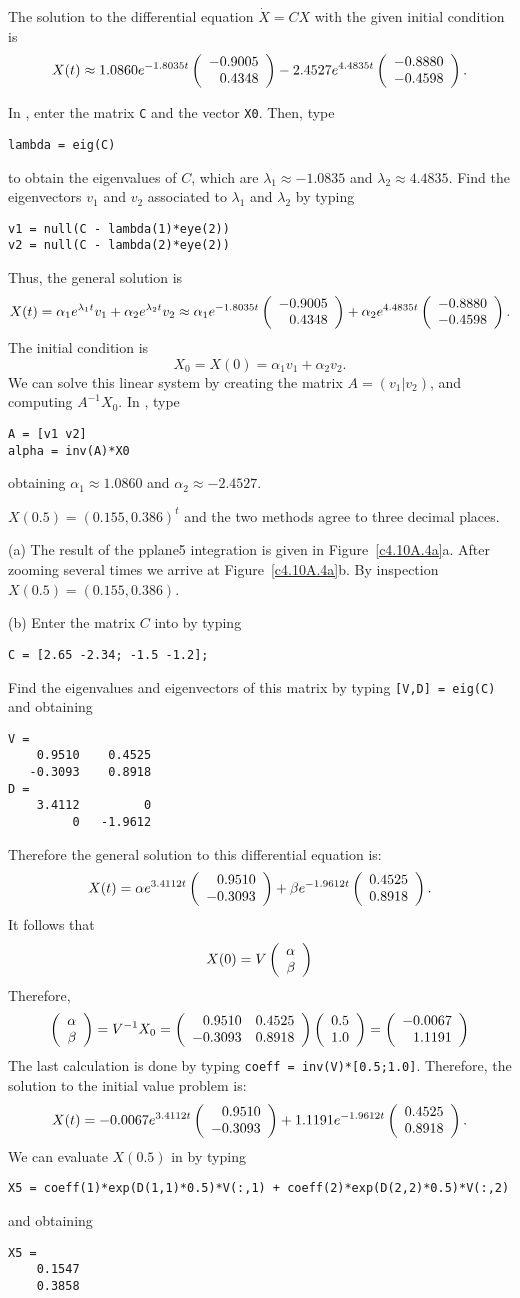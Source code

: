 \documentclass{ximera}
\begin{document}
 \ans The solution to the differential equation $\dot{X}
= CX$ with the given initial condition is
\[
X(t) \approx 1.0860e^{-1.8035t}\left(\begin{array}{r} -0.9005 \\  0.4348\end{array}\right)
- 2.4527e^{4.4835t}\left(\begin{array}{r} -0.8880 \\ -0.4598\end{array}\right).
\]

\soln In \Matlabp, enter the matrix {\tt C} and the vector {\tt X0}.  Then,
type
\begin{verbatim}
lambda = eig(C)
\end{verbatim}
to obtain the eigenvalues of $C$, which are
$\lambda_1 \approx -1.0835$ and $\lambda_2 \approx 4.4835$.  Find the
eigenvectors $v_1$ and $v_2$ associated to $\lambda_1$ and $\lambda_2$
by typing
\begin{verbatim}
v1 = null(C - lambda(1)*eye(2))
v2 = null(C - lambda(2)*eye(2))
\end{verbatim}
Thus, the general solution is
\[
X(t) = \alpha_1e^{\lambda_1 t}v_1 + \alpha_2e^{\lambda_2 t}v_2
\approx \alpha_1e^{-1.8035t}\left(\begin{array}{r} -0.9005 \\  0.4348\end{array}\right) +
\alpha_2e^{4.4835t}\left(\begin{array}{r} -0.8880 \\ -0.4598\end{array}\right).
\]
The initial condition is
\[
X_0 = X(0) = \alpha_1v_1 + \alpha_2v_2.
\]
We can solve this linear system by creating the matrix $A = (v_1|v_2)$, and
computing $A^{-1}X_0$.  In \Matlabp, type
\begin{verbatim}
A = [v1 v2]
alpha = inv(A)*X0
\end{verbatim}
obtaining $\alpha_1 \approx 1.0860$ and $\alpha_2 \approx -2.4527$.

 \ans $X(0.5) = (0.155,0.386)^t$ and the two methods agree to three 
decimal places.

\soln (a) The result of the {\sf pplane5} integration is given in 
Figure~\ref{c4.10A.4a}a. After zooming several times we arrive at
Figure~\ref{c4.10A.4a}b.  By inspection $X(0.5)=(0.155,0.386)$.

(b)  Enter the matrix $C$ into \Matlab by typing
\begin{verbatim}
C = [2.65 -2.34; -1.5 -1.2];
\end{verbatim}
Find the eigenvalues and eigenvectors of this matrix by typing {\tt [V,D] = eig(C)}
and obtaining
\begin{verbatim}
V =
    0.9510    0.4525
   -0.3093    0.8918
D =
    3.4112         0
         0   -1.9612
\end{verbatim}
Therefore the general solution to this differential equation is:
\[
X(t) = \alpha e^{3.4112 t}\left(\begin{array}{r} 0.9510 \\ -0.3093\end{array}\right) +
\beta e^{-1.9612 t}\left(\begin{array}{r} 0.4525 \\ 0.8918\end{array}\right).
\]
It follows that 
\[
X(0) = V \left(\begin{array}{r} \alpha \\ \beta\end{array}\right)
\]
Therefore,
\[
\left(\begin{array}{r} \alpha \\ \beta\end{array}\right) = V^{-1} X_0 = 
\left(\begin{array}{rr} 0.9510 & 0.4525\\ -0.3093 &0.8918\end{array}\right)\left(\begin{array}{r} 0.5 \\ 1.0\end{array}\right) = \left(\begin{array}{r} -0.0067 \\ 1.1191\end{array}\right)
\]
The last calculation is done by typing {\tt coeff = inv(V)*[0.5;1.0]}. 
Therefore, the solution to the initial value problem is:
\[
X(t) = -0.0067e^{3.4112 t}\left(\begin{array}{r} 0.9510 \\ -0.3093\end{array}\right) +
1.1191e^{-1.9612 t}\left(\begin{array}{r} 0.4525 \\ 0.8918\end{array}\right).
\]
We can evaluate $X(0.5)$ in \Matlab by typing
\begin{verbatim}
X5 = coeff(1)*exp(D(1,1)*0.5)*V(:,1) + coeff(2)*exp(D(2,2)*0.5)*V(:,2)
\end{verbatim}
and obtaining
\begin{verbatim}
X5 =
    0.1547
    0.3858
\end{verbatim}
\end{document}
